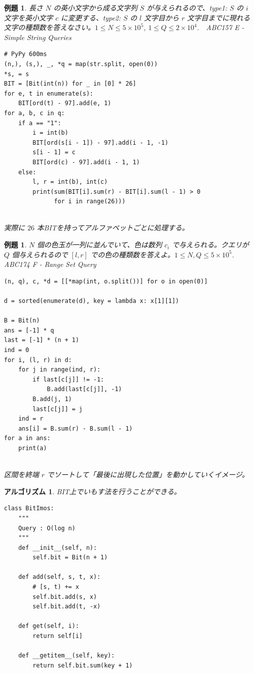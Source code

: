 \documentclass[12pt, a4j]{ltjsarticle}
\newtheorem{alg}[thm]{アルゴリズム}
\newtheorem{exm}[thm]{例題}
\newcommand*{\SS}{\vspace{1cm}}
\begin{document}
\SS

\begin{exm} 長さ $N$ の英小文字から成る文字列 $S$ が与えられるので、type1: $S$ の $i$ 文字を英小文字 $c$ に変更する、type2: $S$ の $l$ 文字目から $r$ 文字目までに現れる文字の種類数を答えなさい。$1\le N\le 5\times 10^5$, $1\le Q\le 2\times 10^4$.\upshape　ABC157 E - Simple String Queries\\
\begin{lstlisting}
# PyPy 600ms
(n,), (s,), _, *q = map(str.split, open(0))
*s, = s
BIT = [Bit(int(n)) for _ in [0] * 26]
for e, t in enumerate(s):
    BIT[ord(t) - 97].add(e, 1)
for a, b, c in q:
    if a == "1":
        i = int(b)
        BIT[ord(s[i - 1]) - 97].add(i - 1, -1)
        s[i - 1] = c
        BIT[ord(c) - 97].add(i - 1, 1)
    else:
        l, r = int(b), int(c)
        print(sum(BIT[i].sum(r) - BIT[i].sum(l - 1) > 0
              for i in range(26)))
\end{lstlisting}\quad\\
実際に $26$ 本BITを持ってアルファベットごとに処理する。
\end{exm}

\SS

\begin{exm}\upshape $N$ 個の色玉が一列に並んでいて、色は数列 $c_i$ で与えられる。クエリが $Q$ 個与えられるので $[l,r]$ での色の種類数を答えよ。$1\le N,Q\le 5\times 10^5$.　ABC174 F - Range Set Query\\
\begin{lstlisting}
(n, q), c, *d = [[*map(int, o.split())] for o in open(0)]

d = sorted(enumerate(d), key = lambda x: x[1][1])

B = Bit(n)
ans = [-1] * q
last = [-1] * (n + 1)
ind = 0
for i, (l, r) in d:
    for j in range(ind, r):
        if last[c[j]] != -1:
            B.add(last[c[j]], -1)
        B.add(j, 1)
        last[c[j]] = j
    ind = r
    ans[i] = B.sum(r) - B.sum(l - 1)
for a in ans:
    print(a)
\end{lstlisting}\quad\\
区間を終端 $r$ でソートして「最後に出現した位置」を動かしていくイメージ。
\end{exm}

\SS

\begin{alg} \upshape BIT上でいもす法を行うことができる。\\
\begin{lstlisting}
class BitImos:　
    """
    Query : O(log n)
    """
    def __init__(self, n):
        self.bit = Bit(n + 1)

    def add(self, s, t, x):
        # [s, t) += x
        self.bit.add(s, x)
        self.bit.add(t, -x)

    def get(self, i):
        return self[i]

    def __getitem__(self, key):
        return self.bit.sum(key + 1)
\end{lstlisting}
\end{alg}
\end{document}
